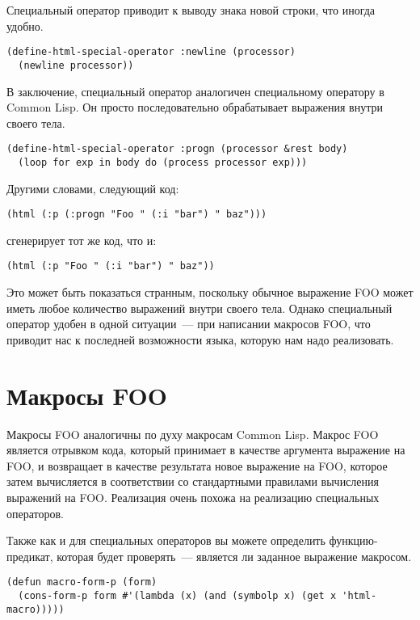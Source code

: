 Специальный оператор  приводит к выводу знака новой строки, что иногда удобно.

\begin{lstlisting}
(define-html-special-operator :newline (processor)
  (newline processor))
\end{lstlisting}

В заключение, специальный оператор  аналогичен специальному оператору
 в Common Lisp.  Он просто последовательно обрабатывает выражения внутри
своего тела.

\begin{lstlisting}
(define-html-special-operator :progn (processor &rest body)
  (loop for exp in body do (process processor exp)))
\end{lstlisting}

Другими словами, следующий код:

\begin{lstlisting}
(html (:p (:progn "Foo " (:i "bar") " baz")))
\end{lstlisting}

сгенерирует тот же код, что и:

\begin{lstlisting}
(html (:p "Foo " (:i "bar") " baz"))
\end{lstlisting}

Это может быть показаться странным, поскольку обычное выражение FOO может иметь любое
количество выражений внутри своего тела.  Однако специальный оператор удобен в одной
ситуации~--- при написании макросов FOO, что приводит нас к последней возможности языка,
которую нам надо реализовать.

\section{Макросы FOO}

Макросы FOO аналогичны по духу макросам Common Lisp.  Макрос FOO является отрывком кода,
который принимает в качестве аргумента выражение на FOO, и возвращает в качестве
результата новое выражение на FOO, которое затем вычисляется в соответствии со
стандартными правилами вычисления выражений на FOO.  Реализация очень похожа на реализацию
специальных операторов.

Также как и для специальных операторов вы можете определить функцию-предикат, которая
будет проверять~--- является ли заданное выражение макросом.

\begin{lstlisting}
(defun macro-form-p (form)
  (cons-form-p form #'(lambda (x) (and (symbolp x) (get x 'html-macro)))))
\end{lstlisting}

